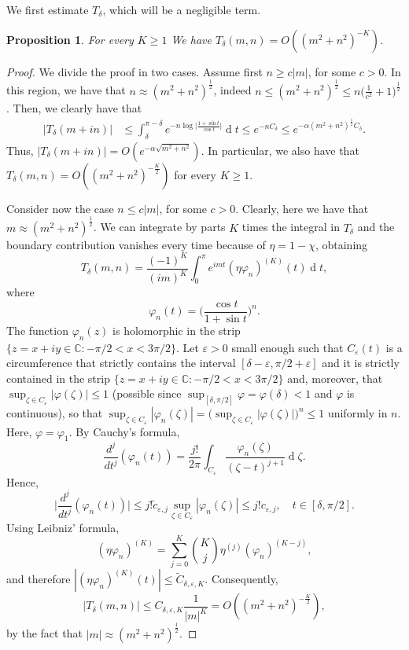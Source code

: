 \documentclass[12pt,a4paper,reqno]{amsart}
\newtheorem{prop}[thm]{Proposition}
\theoremstyle{definition}
\theoremstyle{definition}\newtheorem{defn}[thm]{Definition}
\begin{document}
        We first estimate $T_\delta$, which will be a negligible term. 
        \begin{prop}
          For every $K\geqslant1$  We have $T_\delta(m,n)= O ((m^2+n^2)^{-K})$.
        \end{prop}
        \begin{proof}
            We divide the proof in two cases. Assume first $n\geqslant c|m|$, for some $c>0$. In this region, we have that $n\approx (m^2+n^2)^{\frac 12}$, indeed $n\leqslant (m^2+n^2)^{\frac 12}\leqslant n\Big(\frac 1{c^2}+1\Big)^{\frac 12}$. 
     Then, we clearly have that
    \begin{align}\label{eq:tail}
      |T_\delta(m+in)|&\leqslant\int_{\delta}^{\pi-\delta} e^{-n\log\big|\frac{1+\sin t}{\cos t}\big|}\operatorname{d}\!t\leqslant e^{-nC_\delta}\leqslant e^{-\alpha(m^2+n^2)^{\frac12}C_\delta}.  
    \end{align}
    Thus, $|T_\delta(m+in)|= O (e^{-\alpha\sqrt{m^2+n^2}})$. In particular, we also have that  $T_\delta(m,n)= O ((m^2+n^2)^{-\frac K2})$ for every $K\geqslant 1$.
    
    Consider now the case $n\leqslant  c|m|$, for some $c>0$. Clearly, here we have that $m\approx (m^2+n^2)^{\frac 12}$. We can integrate by parts $K$ times the integral in $T_\delta$ and the boundary contribution vanishes every time because of $\eta=    1-\chi$, obtaining
    \[T_\delta(m,n)=\frac{(-1)^K}{(im)^K}\int_0^{\pi}e^{imt}(\eta\varphi_n)^{(K)}(t)\operatorname{d}\!t, 
    \]
    where
    \[
    \varphi_n(t)=\Big(\frac{\cos t} {1+\sin t} \Big)^n.
    \]
    The function
    $\varphi_n(z)$
    is holomorphic in the strip $\{z=x+iy\in\mathbb C: -\pi/2<x<3\pi/2 \}$. Let $\varepsilon>0$ small enough such that  $C_\varepsilon(t)$ is a circumference that strictly contains the interval $[\delta-\varepsilon,\pi/2+\varepsilon]$ and it is strictly contained in the strip $\{z=x+iy\in\mathbb C: -\pi/2<x<3\pi/2 \}$ and, moreover, that $\sup_{\zeta\in C_\varepsilon}|\varphi(\zeta)|\leqslant 1$
    (possible since $\sup_{[\delta,\pi/2]}\varphi=\varphi(\delta)<1$ and $\varphi$ is continuous),
    so that $\sup_{\zeta\in C_\varepsilon}|\varphi_n(\zeta)|=\big(\sup_{\zeta\in C_\varepsilon}|\varphi(\zeta)|\big)^n\leqslant 1$ uniformly in $n$. Here, $\varphi=\varphi_1$.
    By Cauchy's formula,
    \[
    \frac{d^j}{dt^j}(\varphi_n(t))=\frac{j!}{2\pi}\int_{C_\varepsilon}\frac{\varphi_n(\zeta)}{(\zeta-t)^{j+1}}\operatorname{d}\!\zeta.
    \]
    Hence,
    \[
    \Big|\frac{d^j}{dt^j}(\varphi_n(t))\Big|\leqslant j! \tilde c_{\varepsilon,j}\sup_{\zeta\in  C_\varepsilon}|\varphi_n(\zeta)|\leqslant j! c_{\varepsilon, j},\quad t\in[\delta,\pi/2].
    \]
    Using Leibniz' formula,
    \[(\eta \varphi_n)^{(K)}=\sum_{j=0}^{K}\binom{K}{j}\eta^{(j)}(\varphi_n)^{(K-j)},\]
    and therefore
    $|(\eta \varphi_n)^{(K)}(t)|\leqslant \tilde C_{\delta,\varepsilon,K}$.
    Consequently,
    \[|T_\delta(m,n)|\leqslant C_{\delta,\varepsilon,K}\frac 1{|m|^K}= O ((m^2+n^2)^{-\frac K2}),\]
    by the fact that $|m|\approx (m^2+n^2)^{\frac 12}$.
        \end{proof}
\end{document}
